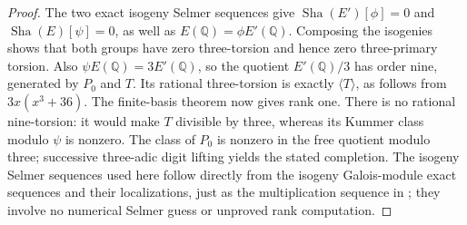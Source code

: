 \begin{proof}
The two exact isogeny Selmer sequences give
$\operatorname{Sha}(E')[\phi]=0$ and
$\operatorname{Sha}(E)[\psi]=0$, as well as
$E(\mathbb Q)=\phi E'(\mathbb Q)$. Composing the isogenies
shows that both groups have zero three-torsion and hence zero
three-primary torsion. Also $\psi E(\mathbb Q)=3E'(\mathbb Q)$,
so the quotient $E'(\mathbb Q)/3$ has order nine, generated by
$P_0$ and $T$. Its rational three-torsion is exactly $\langle T\rangle$,
as follows from $3x(x^3+36)$. The finite-basis theorem
\citep[Chapter IV, p.~105]{AuditMilneEC} now gives rank one.
There is no rational nine-torsion: it would make $T$ divisible by
three, whereas its Kummer class modulo $\psi$ is nonzero.
The class of $P_0$ is nonzero in the free quotient modulo three;
successive three-adic digit lifting yields the stated completion.
The isogeny Selmer sequences used here follow directly from the
isogeny Galois-module exact sequences and their localizations, just
as the multiplication sequence in
\citet[IV.2, (28)--(29)]{AuditMilneEC}; they involve no numerical
Selmer guess or unproved rank computation.
\end{proof}

